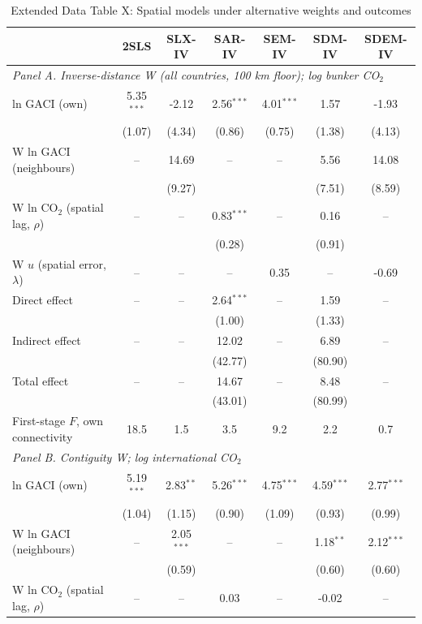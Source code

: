 \begin{table}[htbp]
\centering
\begin{threeparttable}
\caption{Extended Data Table X: Spatial models under alternative weights and outcomes}
\label{tab:spatial_ext}
\scriptsize
\begin{tabular}{lcccccc}
\toprule
 & 2SLS & SLX-IV & SAR-IV & SEM-IV & SDM-IV & SDEM-IV \\
\midrule
\multicolumn{7}{l}{\textit{Panel A. Inverse-distance W (all countries, 100 km floor); log bunker CO$_2$}} \\
  ln GACI (own) & 5.35$^{***}$ & -2.12 & 2.56$^{***}$ & 4.01$^{***}$ & 1.57 & -1.93 \\
   & (1.07) & (4.34) & (0.86) & (0.75) & (1.38) & (4.13) \\
  W ln GACI (neighbours) & -- & 14.69 & -- & -- & 5.56 & 14.08 \\
   &  & (9.27) &  &  & (7.51) & (8.59) \\
  W ln CO$_2$ (spatial lag, $\rho$) & -- & -- & 0.83$^{***}$ & -- & 0.16 & -- \\
   &  &  & (0.28) &  & (0.91) &  \\
  W $u$ (spatial error, $\lambda$) & -- & -- & -- & 0.35 & -- & -0.69 \\
  Direct effect & -- & -- & 2.64$^{***}$ & -- & 1.59 & -- \\
   &  &  & (1.00) &  & (1.33) &  \\
  Indirect effect & -- & -- & 12.02 & -- & 6.89 & -- \\
   &  &  & (42.77) &  & (80.90) &  \\
  Total effect & -- & -- & 14.67 & -- & 8.48 & -- \\
   &  &  & (43.01) &  & (80.99) &  \\
  First-stage $F$, own connectivity & 18.5 & 1.5 & 3.5 & 9.2 & 2.2 & 0.7 \\
\midrule
\multicolumn{7}{l}{\textit{Panel B. Contiguity W; log international CO$_2$}} \\
  ln GACI (own) & 5.19$^{***}$ & 2.83$^{**}$ & 5.26$^{***}$ & 4.75$^{***}$ & 4.59$^{***}$ & 2.77$^{***}$ \\
   & (1.04) & (1.15) & (0.90) & (1.09) & (0.93) & (0.99) \\
  W ln GACI (neighbours) & -- & 2.05$^{***}$ & -- & -- & 1.18$^{**}$ & 2.12$^{***}$ \\
   &  & (0.59) &  &  & (0.60) & (0.60) \\
  W ln CO$_2$ (spatial lag, $\rho$) & -- & -- & 0.03 & -- & -0.02 & -- \\

\end{tabular}
\end{threeparttable}
\end{table}
